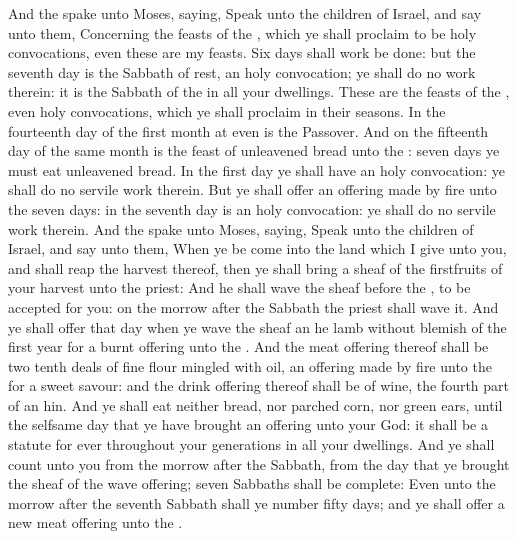 \begin{biblechapter} %
 And the \LORD spake unto Moses, saying,
\verse Speak unto the children of Israel, and say unto them, Concerning the feasts of the \LORD, which ye shall proclaim to be holy convocations, even these are my feasts.
 Six days shall work be done: but the seventh day is the Sabbath of rest, an holy convocation; ye shall do no work therein: it is the Sabbath of the \LORD in all your dwellings.
 These are the feasts of the \LORD, even holy convocations, which ye shall proclaim in their seasons.
\verse In the fourteenth day of the first month at even is the \LORDs Passover.
\verse And on the fifteenth day of the same month is the feast of unleavened bread unto the \LORD: seven days ye must eat unleavened bread.
\verse In the first day ye shall have an holy convocation: ye shall do no servile work therein.
\verse But ye shall offer an offering made by fire unto the \LORD seven days: in the seventh day is an holy convocation: ye shall do no servile work therein.
\columnbreak %
 And the \LORD spake unto Moses, saying,
\verse Speak unto the children of Israel, and say unto them, When ye be come into the land which I give unto you, and shall reap the harvest thereof, then ye shall bring a sheaf of the firstfruits of your harvest unto the priest:
\verse And he shall wave the sheaf before the \LORD, to be accepted for you: on the morrow after the Sabbath the priest shall wave it.
\verse And ye shall offer that day when ye wave the sheaf an he lamb without blemish of the first year for a burnt offering unto the \LORD.
\verse And the meat offering thereof shall be two tenth deals of fine flour mingled with oil, an offering made by fire unto the \LORD for a sweet savour: and the drink offering thereof shall be of wine, the fourth part of an hin.
\verse And ye shall eat neither bread, nor parched corn, nor green ears, until the selfsame day that ye have brought an offering unto your God: it shall be a statute for ever throughout your generations in all your dwellings.
 And ye shall count unto you from the morrow after the Sabbath, from the day that ye brought the sheaf of the wave offering; seven Sabbaths shall be complete:
\verse Even unto the morrow after the seventh Sabbath shall ye number fifty days; and ye shall offer a new meat offering unto the \LORD.

\end{biblechapter}
